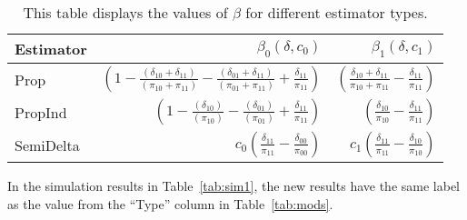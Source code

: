\documentclass[12pt]{article}
\begin{document}
\begin{table}[ht!]
  \centering
  \caption{This table displays the values of $\beta$ for different estimator 
  types.}
  \label{tab:beta}
\begin{tabular}{lrr}
  \toprule
  Estimator & $\beta_0(\delta, c_0)$ & $\beta_1(\delta, c_1)$ \\
  \midrule
  Prop & $\left(1 - \frac{(\delta_{10} + \delta_{11})}{(\pi_{10} + \pi_{11})} - 
  \frac{(\delta_{01} + \delta_{11})}{(\pi_{01} + \pi_{11})} + \frac{\delta_{11}}{\pi_{11}}\right)$ &
  $\left(\frac{\delta_{10} + \delta_{11}}{\pi_{10} + \pi_{11}} - \frac{\delta_{11}}{\pi_{11}}\right)$ \\
  PropInd & $\left(1 - \frac{(\delta_{10})}{(\pi_{10})} - 
  \frac{(\delta_{01})}{(\pi_{01})} + \frac{\delta_{11}}{\pi_{11}}\right)$ &
  $\left(\frac{\delta_{10}}{\pi_{10}} - \frac{\delta_{11}}{\pi_{11}}\right)$ \\
  SemiDelta & $c_0\left(\frac{\delta_{11}}{\pi_{11}} - \frac{\delta_{00}}{\pi_{00}}\right)$ &
  $c_1\left(\frac{\delta_{11}}{\pi_{11}} - \frac{\delta_{10}}{\pi_{10}}\right)$ \\
  \bottomrule
\end{tabular}
\end{table}


In the simulation results in Table~\ref{tab:sim1}, the new results have the 
same label as the value from the ``Type'' column in Table~\ref{tab:mods}.
\end{document}
